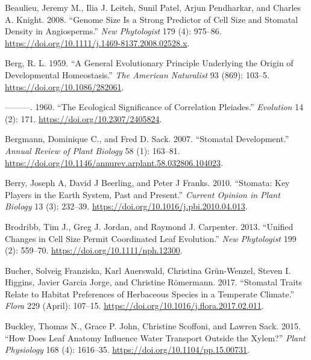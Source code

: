 \documentclass[
  12pt,
]{article}
\newlength{\cslhangindent}
\newlength{\cslentryspacingunit} %
\newenvironment{CSLReferences}[2] %
 {%
  \setlength{\parindent}{0pt}
  \ifodd #1
  \let\oldpar\par
  \def\par{\hangindent=\cslhangindent\oldpar}
  \fi
  \setlength{\parskip}{#2\cslentryspacingunit}
 }%
 {}
\begin{document}
\begin{CSLReferences}{1}{0}
\leavevmode{}%
Beaulieu, Jeremy M., Ilia J. Leitch, Sunil Patel, Arjun Pendharkar, and Charles A. Knight. 2008. {``Genome Size Is a Strong Predictor of Cell Size and Stomatal Density in Angiosperms.''} \emph{New Phytologist} 179 (4): 975--86. \url{https://doi.org/10.1111/j.1469-8137.2008.02528.x}.

\leavevmode{}%
Berg, R. L. 1959. {``A {General} {Evolutionary} {Principle} {Underlying} the {Origin} of {Developmental} {Homeostasis}.''} \emph{The American Naturalist} 93 (869): 103--5. \url{https://doi.org/10.1086/282061}.

\leavevmode{}%
---------. 1960. {``The {Ecological} {Significance} of {Correlation} {Pleiades}.''} \emph{Evolution} 14 (2): 171. \url{https://doi.org/10.2307/2405824}.

\leavevmode{}%
Bergmann, Dominique C., and Fred D. Sack. 2007. {``Stomatal {Development}.''} \emph{Annual Review of Plant Biology} 58 (1): 163--81. \url{https://doi.org/10.1146/annurev.arplant.58.032806.104023}.

\leavevmode{}%
Berry, Joseph A, David J Beerling, and Peter J Franks. 2010. {``Stomata: Key Players in the Earth System, Past and Present.''} \emph{Current Opinion in Plant Biology} 13 (3): 232--39. \url{https://doi.org/10.1016/j.pbi.2010.04.013}.

\leavevmode{}%
Brodribb, Tim J., Greg J. Jordan, and Raymond J. Carpenter. 2013. {``Unified Changes in Cell Size Permit Coordinated Leaf Evolution.''} \emph{New Phytologist} 199 (2): 559--70. \url{https://doi.org/10.1111/nph.12300}.

\leavevmode{}%
Bucher, Solveig Franziska, Karl Auerswald, Christina Grün-Wenzel, Steven I. Higgins, Javier Garcia Jorge, and Christine Römermann. 2017. {``Stomatal Traits Relate to Habitat Preferences of Herbaceous Species in a Temperate Climate.''} \emph{Flora} 229 (April): 107--15. \url{https://doi.org/10.1016/j.flora.2017.02.011}.

\leavevmode{}%
Buckley, Thomas N., Grace P. John, Christine Scoffoni, and Lawren Sack. 2015. {``How {Does} {Leaf} {Anatomy} {Influence} {Water} {Transport} Outside the {Xylem}?''} \emph{Plant Physiology} 168 (4): 1616--35. \url{https://doi.org/10.1104/pp.15.00731}.


\end{CSLReferences}
\end{document}
